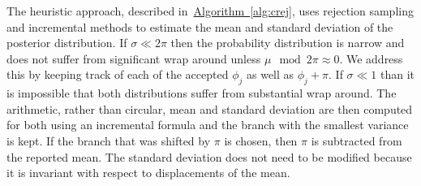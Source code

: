\documentclass[aps,pra,amsmath,twocolumn,amssymb,superscriptaddress]{revtex4-1}
\newcommand{\alg}[1]{\hyperref[alg:#1]{Algorithm~\ref*{alg:#1}}}
\begin{document}
The heuristic approach, described in~\alg{crej}, uses rejection sampling and incremental methods to estimate the mean and standard deviation of the posterior distribution.  If $\sigma\ll 2\pi$ then the probability distribution is narrow and does not suffer from significant wrap around unless $\mu \mod 2\pi \approx 0$.  We address this by keeping track of each of the accepted $\phi_j$ as well as $\phi_j+\pi$.  If $\sigma\ll 1$ than it is impossible that both distributions suffer from substantial wrap around.  The arithmetic, rather than circular, mean and standard deviation are then computed for both using an incremental formula and the branch with the smallest variance is kept.  If the branch that was shifted by $\pi$ is chosen, then $\pi$ is subtracted from the reported mean.  The standard deviation does not need to be modified because it is invariant with respect to displacements of the mean.
\end{document}
